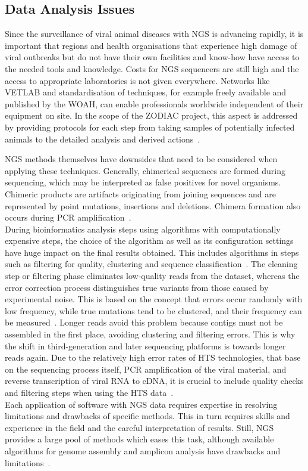 \subsection{Data Analysis Issues}
Since the surveillance of viral animal diseases with \ac{NGS} is advancing rapidly, it is important that regions and health organisations that experience high damage of viral outbreaks but do not have their own facilities and know-how have access to the needed tools and knowledge. Costs for \ac{NGS} sequencers are still high and the access to appropriate laboratories is not given everywhere. Networks like \ac{VETLAB} and standardisation of techniques, for example freely available and published by the \ac{WOAH}, can enable professionals worldwide independent of their equipment on site. In the scope of the \ac{ZODIAC} project, this aspect is addressed by providing protocols for each step from taking samples of potentially infected animals to the detailed analysis and derived actions~\cite{zodiac2021}.

\ac{NGS} methods themselves have downsides that need to be considered when applying these techniques. Generally, chimerical sequences are formed during sequencing, which may be interpreted as false positives for novel organisms. Chimeric products are artifacts originating from joining sequences and are represented by point mutations, insertions and deletions. Chimera formation also occurs during \ac{PCR} amplification~\cite{zylstra1998pcr}.\\
During bioinformatics analysis steps using algorithms with computationally expensive steps, the choice of the algorithm as well as its configuration settings have huge impact on the final results obtained. This includes algorithms in steps such as filtering for quality, clustering and sequence classification~\cite{kopylova2016open}. The cleaning step or filtering phase eliminates low-quality reads from the dataset, whereas the error correction process distinguishes true variants from those caused by experimental noise. This is based on the concept that errors occur randomly with low frequency, while true mutations tend to be clustered, and their frequency can be measured~\cite{zagordi2010error}. Longer reads avoid this problem because contigs must not be assembled in the first place, avoiding clustering and filtering errors. This is why the shift in third-generation and later sequencing platforms is towards longer reads again. Due to the relatively high error rates of \ac{HTS} technologies, that base on the sequencing process itself, \ac{PCR} amplification of the viral material, and reverse transcription of viral \ac{RNA} to \ac{cDNA}, it is crucial to include quality checks and filtering steps when using the \ac{HTS} data~\cite{beerenwinkel2012challenges}. \\
Each application of software with \ac{NGS} data requires expertise in resolving limitations and drawbacks of specific methods. This in turn requires skills and experience in the field and the careful interpretation of results. Still, \ac{NGS} provides a large pool of methods which eases this task, although available algorithms for genome assembly and amplicon analysis have drawbacks and limitations~\cite{finotello2012comparative}.

